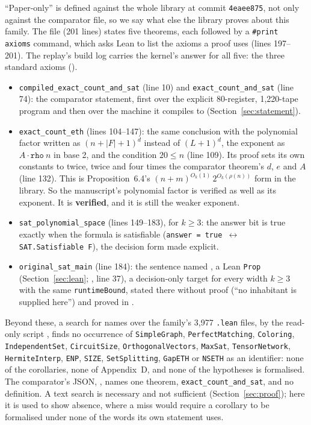 ``Paper-only'' is defined against the whole library at commit
\texttt{4eaee875}, not only against the comparator file, so we say what
else the library proves about this family. The file
 (201 lines) states five theorems,
each followed by a \texttt{\#print axioms} command, which asks Lean to
list the axioms a proof uses (lines 197--201). The replay's build log
carries the kernel's answer for all five: the three standard axioms
().
\begin{itemize}\sloppy
\item \texttt{compiled\_exact\_count\_and\_sat} (line 10) and
  \texttt{exact\_count\_and\_sat} (line 74): the comparator statement,
  first over the explicit 80-register, 1,220-tape program and then over
  the machine it compiles to (Section~\ref{sec:statement}).
\item \texttt{exact\_count\_eth} (lines 104--147): the same conclusion
  with the polynomial factor written as $(n + |F| + 1)^{d}$ instead of
  $(L+1)^d$, the exponent as $A\cdot\mathtt{rho}\ n$ in base 2, and the
  condition $20 \le n$ (line 109). Its proof sets its own constants to twice, twice and four times the comparator theorem's $d$, $e$ and $A$ (line 132). This is
  Proposition~6.4's $(n+m)^{O_k(1)}\,2^{O_k(\rho(n))}$ form in the
  library. So the manuscript's polynomial factor is verified as well as
  its exponent. It is \textbf{verified}, and it is still the weaker
  exponent.
\item \texttt{sat\_polynomial\_space} (lines 149--183), for $k \ge 3$:
  the answer bit is true exactly when the formula is satisfiable
  (\texttt{answer = true $\leftrightarrow$ SAT.Satisfiable F}), the
  decision form made explicit.
\item \texttt{original\_sat\_main} (line 184): the sentence named
  , a Lean \texttt{Prop}
  (Section~\ref{sec:lean}; ,
  line 37), a decision-only
  target for every width $k \ge 3$ with the same \texttt{runtimeBound},
  stated there without proof (``no inhabitant is supplied here'') and proved in .
\end{itemize}
\begin{sloppypar}
Beyond these, a search for names over the family's 3,977 \texttt{.lean}
files, by the read-only script ,
finds no occurrence of \texttt{SimpleGraph}, \texttt{PerfectMatching},
\texttt{Coloring}, \texttt{IndependentSet}, \texttt{CircuitSize},
\texttt{OrthogonalVectors}, \texttt{MaxSat}, \texttt{TensorNetwork},
\texttt{HermiteInterp}, \texttt{ENP}, \texttt{SIZE},
\texttt{SetSplitting}, \texttt{GapETH} or \texttt{NSETH} as an
identifier: none of the corollaries, none of Appendix~D, and none of
the hypotheses is formalised. The comparator's JSON,
, names one
theorem, \texttt{exact\_count\_and\_sat}, and no definition. A text
search is necessary and not sufficient (Section~\ref{sec:proof}); here
it is used to show absence, where a miss would require a corollary to
be formalised under none of the words its own statement uses.
\end{sloppypar}

